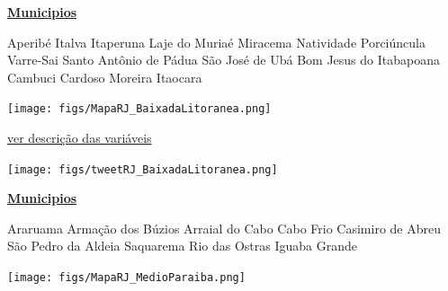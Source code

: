 \documentclass[10pt]{article} %
\begin{document}
\begin{minipage}[t]{.30\linewidth}
\begin{mdframed}[style=sidebar,frametitle={}]
\textbf{\hyperlink{municips}{Municipios}}\begin{itemize}\gsquare Aperibé 
\gsquare Italva 
\gsquare Itaperuna 
\gsquare Laje do Muriaé 
\gsquare Miracema 
\gsquare Natividade 
\gsquare Porciúncula 
\gsquare Varre-Sai 
\gsquare Santo Antônio de Pádua 
\gsquare São José de Ubá 
\gsquare Bom Jesus do Itabapoana 
\gsquare Cambuci 
\gsquare Cardoso Moreira 
\gsquare Itaocara 
\end{itemize}\BackToContents\end{mdframed}\hfill\end{minipage}\newpage\begin{minipage}[t]{.66\linewidth}
\hypertarget{BxdL}{}
\texttt{[image: figs/MapaRJ\_BaixadaLitoranea.png]}\vspace{0.5cm}\begin{center}

\end{center}
\small{\hyperlink{vartab}{ver descrição das variáveis}}\vspace{0.5cm}\begin{center}
\texttt{[image: figs/tweetRJ\_BaixadaLitoranea.png]}\end{center}
\end{minipage}\hfill\begin{minipage}[t]{.30\linewidth}
\begin{mdframed}[style=sidebar,frametitle={}]
\textbf{\hyperlink{municips}{Municipios}}\begin{itemize}\gsquare Araruama 
\gsquare Armação dos Búzios 
\gsquare Arraial do Cabo 
\gsquare Cabo Frio 
\gsquare Casimiro de Abreu 
\gsquare São Pedro da Aldeia 
\gsquare Saquarema 
\gsquare Rio das Ostras 
\gsquare Iguaba Grande 
\end{itemize}\BackToContents\end{mdframed}\hfill\end{minipage}\newpage\begin{minipage}[t]{.66\linewidth}
\hypertarget{MdPr}{}
\texttt{[image: figs/MapaRJ\_MedioParaiba.png]}\vspace{0.5cm}\begin{center}

\end{center}
\end{minipage}
\end{document}
